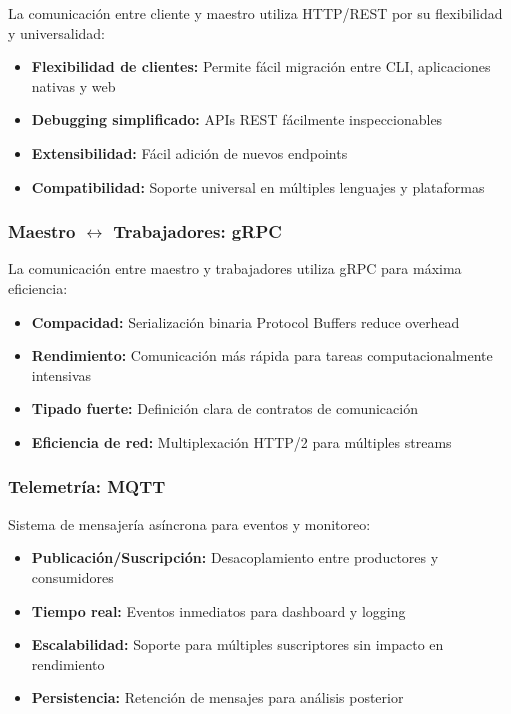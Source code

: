 La comunicación entre cliente y maestro utiliza HTTP/REST por su flexibilidad y universalidad:

\begin{itemize}
    \item \textbf{Flexibilidad de clientes:} Permite fácil migración entre CLI, aplicaciones nativas y web
    \item \textbf{Debugging simplificado:} APIs REST fácilmente inspeccionables
    \item \textbf{Extensibilidad:} Fácil adición de nuevos endpoints
    \item \textbf{Compatibilidad:} Soporte universal en múltiples lenguajes y plataformas
\end{itemize}

\subsubsection{Maestro $\leftrightarrow$ Trabajadores: gRPC}

La comunicación entre maestro y trabajadores utiliza gRPC para máxima eficiencia:

\begin{itemize}
    \item \textbf{Compacidad:} Serialización binaria Protocol Buffers reduce overhead
    \item \textbf{Rendimiento:} Comunicación más rápida para tareas computacionalmente intensivas
    \item \textbf{Tipado fuerte:} Definición clara de contratos de comunicación
    \item \textbf{Eficiencia de red:} Multiplexación HTTP/2 para múltiples streams
\end{itemize}

\subsubsection{Telemetría: MQTT}

Sistema de mensajería asíncrona para eventos y monitoreo:

\begin{itemize}
    \item \textbf{Publicación/Suscripción:} Desacoplamiento entre productores y consumidores
    \item \textbf{Tiempo real:} Eventos inmediatos para dashboard y logging
    \item \textbf{Escalabilidad:} Soporte para múltiples suscriptores sin impacto en rendimiento
    \item \textbf{Persistencia:} Retención de mensajes para análisis posterior
\end{itemize}

